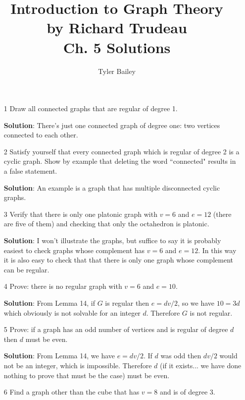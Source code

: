 \documentclass{article}
\begin{document}
	\title{%
  	Introduction to Graph Theory \\
  		\large by Richard Trudeau \\
   		Ch. 5 Solutions}
   		\author{Tyler Bailey}
	\maketitle

	\begin{enumerate}

		\item[1] Draw all connected graphs that are regular of degree 1.
		
		\textbf{Solution}: There's just one connected graph of degree one: two vertices connected to each other.
		
		\item[2] Satisfy yourself that every connected graph which is regular of degree 2 is a cyclic graph. Show by example that deleting the word ``connected" results in a false statement.
		
		\textbf{Solution}: An example is a graph that has multiple disconnected cyclic graphs.
		
		\item[3] Verify that there is only one platonic graph with $v = 6$ and $e = 12$ (there are five of them) and checking that only the octahedron is platonic.
		
		\textbf{Solution}: I won't illustrate the graphs, but suffice to say it is probably easiest to check graphs whose complement has $v = 6$ and $e = 12$. In this way it is also easy to check that that there is only one graph whose complement can be regular.
		
		\item[4] Prove: there is no regular graph with $v = 6$ and $e = 10$.
		
		\textbf{Solution}: From Lemma 14, if $G$ is regular then $e = dv/2$, so we have $10 = 3d$ which obviously is not solvable for an integer $d$. Therefore $G$ is not regular.
		
		\item[5] Prove: if a graph has an odd number of vertices and is regular of degree $d$ then $d$ must be even.
		
		\textbf{Solution}: From Lemma 14, we have $e = dv/2$. If $d$ was odd then $dv/2$ would not be an integer, which is impossible. Therefore $d$ (if it exists... we have done nothing to prove that must be the case) must be even.
		
		\item[6] Find a graph other than the cube that has $v = 8$ and is of degree 3.
		

\end{enumerate}
\end{document}
